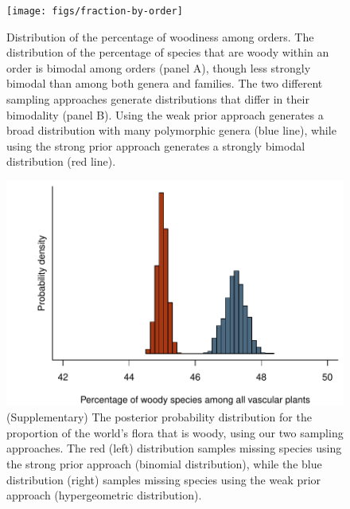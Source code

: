\documentclass[a4paper,12pt]{article}
\begin{document}
\begin{figure}[p]
  \centering
  \texttt{[image: figs/fraction-by-order]}
  \caption{Distribution of the percentage of woodiness among orders.
    The distribution of the percentage of species that are woody within
    an order is bimodal among orders (panel A), though
    less strongly bimodal than among both genera and families.
    The two different sampling approaches generate distributions that
    differ in their bimodality (panel B).  Using the weak prior
    approach generates a broad distribution with many polymorphic
    genera (blue line), while using the strong prior approach
    generates a strongly bimodal distribution (red line).}
  \label{fig:distribution-order}
\end{figure}

\begin{figure}[p]
  \centering
  \includegraphics{figs/distribution-raw}
  \caption{(Supplementary) The posterior probability distribution for
    the proportion of the world's flora that is woody, using our two
    sampling approaches.  The red (left) distribution samples missing
    species using the strong prior approach (binomial distribution),
    while the blue distribution (right) samples missing species using
    the weak prior approach (hypergeometric distribution).}
  \label{fig:distribution-raw}
\end{figure}
\end{document}
